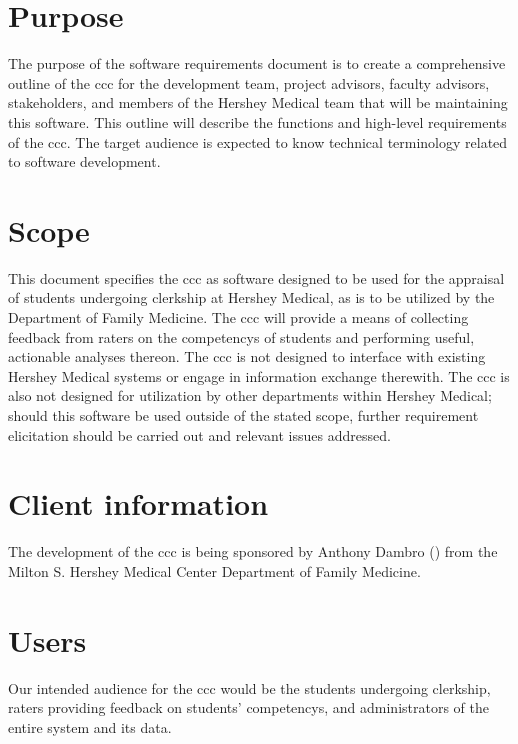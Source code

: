 \documentclass[letterpaper,article,oneside]{memoir}
\begin{document}
\section{Purpose}

The purpose of the software requirements document is to create a comprehensive outline of the \gls{ccc} for the development team, project advisors, faculty advisors, stakeholders, and members of the Hershey Medical team that will be maintaining this software.
This outline will describe the functions and high-level requirements of the \gls{ccc}.
The target audience is expected to know technical terminology related to software development.

\section{Scope}

This document specifies the \gls{ccc} as software designed to be used for the appraisal of \glspl{student} undergoing \gls{clerkship} at Hershey Medical, as is to be utilized by the Department of Family Medicine.
The \gls{ccc} will provide a means of collecting feedback from \glspl{rater} on the \glspl{competency} of \glspl{student} and performing useful, actionable analyses thereon.
The \gls{ccc} is not designed to interface with existing Hershey Medical systems or engage in information exchange therewith.
The \gls{ccc} is also not designed for utilization by other departments within Hershey Medical; should this software be used outside of the stated scope, further requirement elicitation should be carried out and relevant issues addressed.

\section{Client information}

The development of the \gls{ccc} is being sponsored by Anthony Dambro () from the Milton S. Hershey Medical Center Department of Family Medicine.

\section{Users}

Our intended audience for the \gls{ccc} would be the \glspl{student} undergoing \gls{clerkship}, \glspl{rater} providing feedback on \glspl{student}' \glspl{competency}, and \glspl{administrator} of the entire system and its data.
\end{document}

